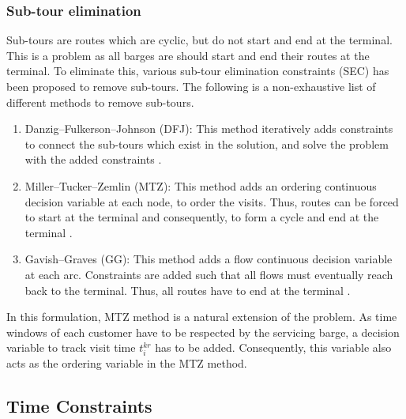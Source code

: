 \subsubsection{Sub-tour elimination}
Sub-tours are routes which are cyclic, but do not start and end at the terminal. This is a problem as all barges are should start and end their routes at the terminal. To eliminate this, various sub-tour elimination constraints (SEC) has been proposed to remove sub-tours. The following is a non-exhaustive list of different methods to remove sub-tours.
\begin{enumerate}
\item Danzig–Fulkerson–Johnson (DFJ): This method iteratively adds constraints to connect the sub-tours which exist in the solution, and solve the problem with the added constraints \cite{dantzig_solution_1954}. 
\item Miller–Tucker–Zemlin (MTZ): This method adds an ordering continuous decision variable at each node, to order the visits. Thus, routes can be forced to start at the terminal and consequently, to form a cycle and end at the terminal \cite{miller_integer_1960}.
\item  Gavish–Graves (GG): This method adds a flow continuous decision variable at each arc. Constraints are added such that all flows must eventually reach back to the terminal. Thus, all routes have to end at the terminal \cite{gavish_travelling_1978}.
\end{enumerate}

In this formulation, MTZ method is a natural extension of the problem. As time windows of each customer have to be respected by the servicing barge, a decision variable to track visit time $t_{i}^{kr}$ has to be added. Consequently, this variable also acts as the ordering variable in the MTZ method.

\subsection{Time Constraints}

